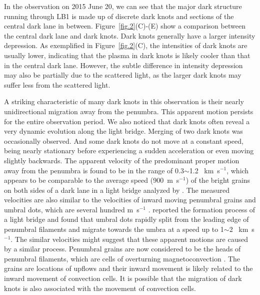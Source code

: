 \documentclass[preprint2]{aastex}
\begin{document}
In the observation on 2015 June 20, we can see that the major dark structure running through LB1 is made up of discrete dark knots and sections of the central dark lane in between. Figure~\ref{fig.2}(C)-(E) show a comparison between the central dark lane and dark knots. Dark knots generally have a larger intensity depression. As exemplified in Figure~\ref{fig.2}(C), the intensities of dark knots are usually lower, indicating that the plasma in dark knots is likely cooler than that in the central dark lane. However, the subtle difference in intensity depression may also be partially due to the scattered light, as the larger dark knots may suffer less from the scattered light.

A striking characteristic of many dark knots in this observation is their nearly unidirectional migration away from the penumbra. This apparent motion persists for the entire observation period. We also noticed that dark knots often reveal a very dynamic evolution along the light bridge. Merging of two dark knots was occasionally observed. And some dark knots do not move at a constant speed, being nearly stationary before experiencing a sudden acceleration or even moving slightly backwards. The apparent velocity of the predominant proper motion away from the penumbra is found to be in the range of 0.3$\sim$1.2 ~km~s$^{-1}$, which appears to be comparable to the average speed (900~m~s$^{-1}$) of the bright grains on both sides of a dark lane in a light bridge analyzed by \cite{BergerandandBerdyugina2003}. The measured velocities are also similar to the velocities of inward moving penumbral grains and umbral dots, which are several hundred m~s$^{-1}$ \citep{Zhang2007,Riethmuller2008}. \cite{Kasukawa2007} reported the formation process of a light bridge and found that umbral dots rapidly split from the leading edge of penumbral filaments and migrate towards the umbra at a speed up to 1$\sim$2 ~km~s$^{-1}$. The similar velocities might suggest that these apparent motions are caused by a similar process. Penumbral grains are now considered to be the heads of penumbral filaments, which are cells of overturning magnetoconvection \citep{Rempel2009a,Rempel2009b,Rempel2011,Scharmer2011,Joshi2011,Tiwari2013}. The grains are locations of upflows and their inward movement is likely related to the inward movement of convection cells. It is possible that the migration of dark knots is also associated with the movement of convection cells.
\end{document}
